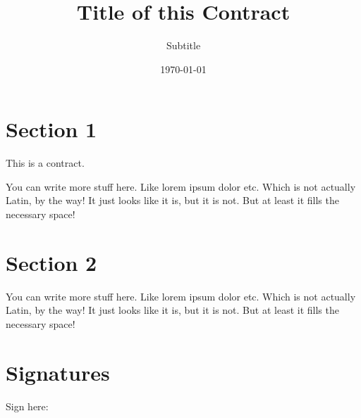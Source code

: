 \documentclass[11pt,enlargefirstpage=true,headlines=4]{scrartcl}
\title{Title of this Contract}
\subtitle{Subtitle}
\date{\today} %
\begin{document}
	\maketitle

	\section{Section 1}

	This is a contract.

	You can write more stuff here. Like lorem ipsum dolor etc. Which is not
	actually Latin, by the way! It just looks like it is, but it is not. But at
	least it fills the necessary space!

	\section{Section 2}

	You can write more stuff here. Like lorem ipsum dolor etc. Which is not
	actually Latin, by the way! It just looks like it is, but it is not. But at
	least it fills the necessary space!

	\section{Signatures}

  Sign here:

	\hspace{\quad}
\end{document}
